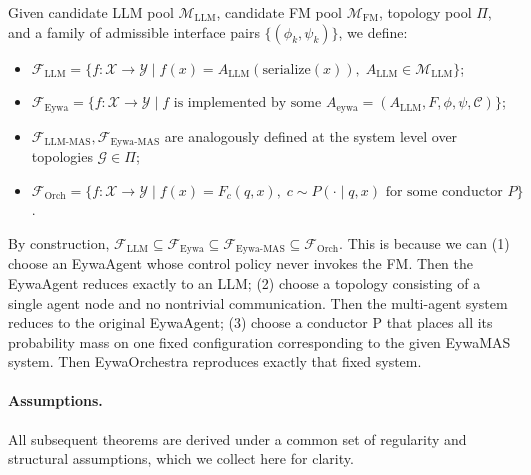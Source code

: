 \begin{definition}
\label{def:function_classes}
Given candidate LLM pool $\mathcal{M}_{\mathrm{LLM}}$, candidate FM pool $\mathcal{M}_{\mathrm{FM}}$, topology pool $\Pi$, and a family of admissible interface pairs $\{(\phi_k,\psi_k)\}$, we define:
\begin{itemize}
    \item $\mathcal{F}_{\mathrm{LLM}}=\{f:\mathcal{X}\to\mathcal{Y}\mid f(x)=A_{\mathrm{LLM}}(\mathrm{serialize}(x)),\; A_{\mathrm{LLM}}\in\mathcal{M}_{\mathrm{LLM}}\}$;
    \item $\mathcal{F}_{\mathrm{Eywa}}=\{f:\mathcal{X}\to\mathcal{Y}\mid f \text{ is implemented by some } A_{\mathrm{eywa}}=(A_{\mathrm{LLM}},F,\phi,\psi,\mathcal{C})\}$;
    \item $\mathcal{F}_{\mathrm{LLM\text{-}MAS}},\mathcal{F}_{\mathrm{Eywa\text{-}MAS}}$ are analogously defined at the system level over topologies $\mathcal{G}\in\Pi$;
    \item $\mathcal{F}_{\mathrm{Orch}}=\{f:\mathcal{X}\to\mathcal{Y}\mid f(x)=F_{c}(q,x),\;c\sim P(\cdot\mid q,x)\text{ for some conductor }P\}$.
\end{itemize}
\end{definition}
By construction, $\mathcal{F}_{\mathrm{LLM}}\subseteq\mathcal{F}_{\mathrm{Eywa}}\subseteq\mathcal{F}_{\mathrm{Eywa\text{-}MAS}}\subseteq\mathcal{F}_{\mathrm{Orch}}$. This is because we can (1) choose an EywaAgent whose control policy never invokes the FM. Then the EywaAgent reduces exactly to an LLM; (2) choose a topology consisting of a single agent node and no nontrivial communication. Then the multi-agent system reduces to the original EywaAgent; (3) choose a conductor P that places all its probability mass on one fixed configuration corresponding to the given EywaMAS system. Then EywaOrchestra reproduces exactly that fixed system.

\clearpage



\paragraph{Assumptions.}
All subsequent theorems are derived under a common set of regularity and structural assumptions, which we collect here for clarity.


